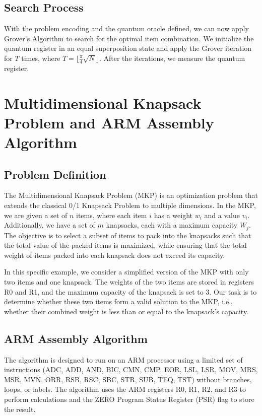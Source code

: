 \subsection{Search Process}
With the problem encoding and the quantum oracle defined, we can now apply Grover's Algorithm to search for the optimal item combination. We initialize the quantum register in an equal superposition state and apply the Grover iteration for $T$ times, where $T = \lfloor\frac{\pi}{4}\sqrt{N}\rfloor$. After the iterations, we measure the quantum register,

\section{Multidimensional Knapsack Problem and ARM Assembly Algorithm}

\subsection{Problem Definition}
The Multidimensional Knapsack Problem (MKP) is an optimization problem that extends the classical 0/1 Knapsack Problem to multiple dimensions. In the MKP, we are given a set of $n$ items, where each item $i$ has a weight $w_i$ and a value $v_i$. Additionally, we have a set of $m$ knapsacks, each with a maximum capacity $W_j$. The objective is to select a subset of items to pack into the knapsacks such that the total value of the packed items is maximized, while ensuring that the total weight of items packed into each knapsack does not exceed its capacity.

In this specific example, we consider a simplified version of the MKP with only two items and one knapsack. The weights of the two items are stored in registers R0 and R1, and the maximum capacity of the knapsack is set to 3. Our task is to determine whether these two items form a valid solution to the MKP, i.e., whether their combined weight is less than or equal to the knapsack's capacity.

\subsection{ARM Assembly Algorithm}
The algorithm is designed to run on an ARM processor using a limited set of instructions (ADC, ADD, AND, BIC, CMN, CMP, EOR, LSL, LSR, MOV, MRS, MSR, MVN, ORR, RSB, RSC, SBC, STR, SUB, TEQ, TST) without branches, loops, or labels. The algorithm uses the ARM registers R0, R1, R2, and R3 to perform calculations and the ZERO Program Status Register (PSR) flag to store the result.

